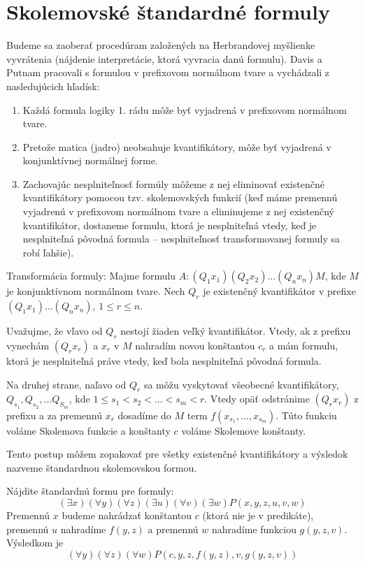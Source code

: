 \section{Skolemovské štandardné formuly}

Budeme sa zaoberať procedúram založených na Herbrandovej myšlienke vyvrátenia 
(nájdenie interpretácie, ktorá vyvracia danú formulu).
Davis a Putnam pracovali s formulou v prefixovom
normálnom tvare a vychádzali z nasledujúcich hľadísk:
\begin{enumerate}
    \item Každá formula logiky 1. rádu
        môže byť vyjadrená v prefixovom normálnom tvare.

    \item Pretože matica (jadro) neobsahuje kvantifikátory, môže byť
        vyjadrená v konjunktívnej normálnej forme.

    \item Zachovajúc nesplniteľnosť formúly môžeme z nej eliminovať
        existenčné kvantifikátory pomocou tzv. skolemovských funkcií (keď máme
        premennú vyjadrenú v prefixovom normálnom tvare a eliminujeme z nej
        existenčný kvantifikátor, dostaneme formulu, ktorá je nesplniteľná
        vtedy, keď je nesplniteľná pôvodná formula -- nesplniteľnosť
        transformovanej formuly sa robí ľahšie).
\end{enumerate}

Transformácia formuly:
Majme formulu $A: (Q_1 x_1) (Q_2 x_2) \ldots (Q_n x_n) M$,
kde $M$ je konjunktívnom normálnom tvare.
Nech $Q_r$ je existenčný kvantifikátor v prefixe $(Q_1 x_1) \ldots
(Q_n x_n)$, $1 \le r \le n$.

Uvažujme, že vľavo od $Q_r$ nestojí žiaden veľký kvantifikátor.
Vtedy, ak z prefixu vynechám $(Q_r x_r)$ a $x_r$ v $M$ nahradím
novou konštantou $c_r$ a mám formulu, ktorá je nesplniteľná práve
vtedy, keď bola nesplniteľná pôvodná formula.

Na druhej strane, naľavo od $Q_r$ sa môžu vyskytovať všeobecné
kvantifikátory, $Q_{s_1}, Q_{s_2}, \dots Q_{S_m}$,
kde $1 \le s_1 < s_2 < \dots < s_m < r$.
Vtedy opäť odstránime $(Q_r x_r)$ z prefixu a
za premennú $x_r$ dosadíme do $M$ term 
$f(x_{s_1}, \ldots, x_{s_m})$. Túto funkciu voláme Skolemova funkcie a
konštanty $c$ voláme Skolemove konštanty.

Tento postup môžem zopakovať pre všetky existenčné kvantifikátory a
výsledok nazveme štandardnou skolemovskou formou.

\begin{priklad}
    Nájdite štandardnú formu pre formuly:
    \begin{equation*}
        (\exists x) (\forall y) (\forall z) (\exists u) (\forall v) (\exists w)
        P(x,y,z,u,v,w)
    \end{equation*}
    Premennú $x$ budeme nahrádzať konštantou $c$ (ktorá nie je v predikáte),
    premennú $u$ nahradíme $f(y,z)$ a
    premennú $w$ nahradíme funkciou $g(y,z,v)$. Výsledkom je
    \begin{equation*}
        (\forall y)(\forall z)(\forall w) P(c,y,z,f(y,z),v,g(y,z,v))
    \end{equation*}
\end{priklad}

